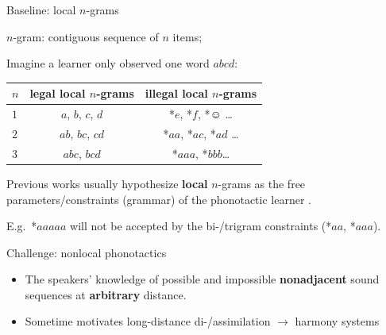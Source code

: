 \begin{frame}{Baseline: {local} $n$-grams}

\begin{itemize}
    \item $n$-gram: contiguous sequence of $n$ items;
    \item Imagine a learner only observed one word $abcd$:\\
    \begin{center}
    \begin{tabular}{lcc}
        $n$ & legal local $n$-grams & illegal local $n$-grams\\\midrule
        $1$ & $a$, $b$, $c$, $d$ & *$e$, *$f$, *$\smiley$ \ldots\\
        $2$ & $ab$, $bc$, $cd$ & *$aa$, *$ac$, *$ad$ \ldots\\
        $3$ & $abc$, $bcd$ & *$aaa$, *$bbb$\ldots \\
    \end{tabular}
    \end{center}
   {\item Previous works usually hypothesize \textbf{local} $n$-grams as the free parameters/constraints (grammar) of the phonotactic learner \citep{hayes2008maximum}.
  

    \item E.g.\ *$aaaaa$ will not be accepted by the bi-/trigram constraints (*$aa$, *$aaa$). }
\end{itemize}


    
\end{frame}

\begin{frame}{Challenge: nonlocal phonotactics}
\begin{itemize}
\item The speakers' knowledge of possible and impossible \textbf{nonadjacent} sound sequences at \textbf{arbitrary} distance.
\item Sometime motivates long-distance di-/assimilation $\rightarrow$ harmony systems
 
 \end{itemize}
\end{frame}

